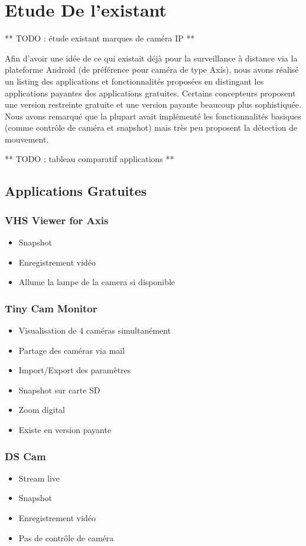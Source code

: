 \chapter{Etude De l'existant}

** TODO : étude existant marques de caméra IP **

Afin d'avoir une idée de ce qui existait déjà pour la surveillance à distance via la plateforme Android (de préférence pour caméra de type Axis), nous avons réalisé un listing des applications
et fonctionnalités proposées en distingant les applications payantes des applications gratuites. Certains concepteurs proposent une version restreinte gratuite et une version payante beaucoup
plus sophistiquée. Nous avons remarqué que la plupart avait implémenté les fonctionnalités basiques (comme contrôle de caméra et snapshot) mais très peu proposent la détection de mouvement.

** TODO : tableau comparatif applications **
\section{Applications Gratuites}
\subsection{VHS Viewer for Axis}
\begin{itemize}
  \item Snapshot
  \item Enregistrement vidéo
  \item Allume la lampe de la camera si disponible
\end{itemize}

\subsection{Tiny Cam Monitor}
\begin{itemize}
  \item Visualisation de 4 caméras simultanément
  \item Partage des caméras via mail
  \item Import/Export des paramètres
  \item Snapshot sur carte SD
  \item Zoom digital
  \item Existe en version payante
\end{itemize}

\subsection{DS Cam}
\begin{itemize}
  \item Stream live
  \item Snapshot
  \item Enregistrement vidéo
  \item Pas de contrôle de caméra
\end{itemize}

